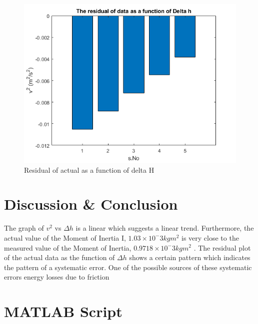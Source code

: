 \begin{figure}[h!]
    \centering
    \includegraphics[width=\textwidth]{figures/residual_h.png}
    \caption{Residual of actual as a function of delta H}
    \label{fig:yx}
\end{figure}



\section{Discussion \& Conclusion}

The graph of $v^2$ vs $\Delta h$ is a linear which suggests a linear trend. Furthermore, the actual value of the Moment of Inertia I, $1.03 \times 10^-3 kg m^2$ is very close to the measured value of the Moment of Inertia, $0.9718 \times 10^-3 kg m^2 $ . The residual plot of the actual data as the function of $\Delta h$  shows a certain pattern which indicates the pattern of a systematic error. One of the possible sources of these systematic errors energy losses due to friction


\section{MATLAB Script}





